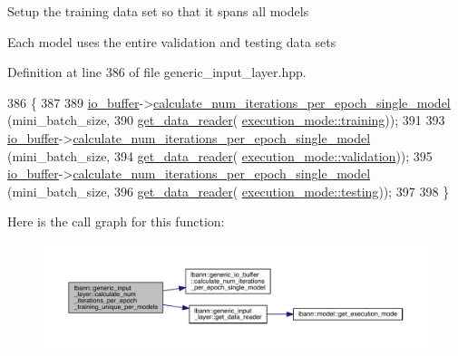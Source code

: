 Setup the training data set so that it spans all models

Each model uses the entire validation and testing data sets 

Definition at line 386 of file generic\+\_\+input\+\_\+layer.\+hpp.


\begin{DoxyCode}
386                                                                                           \{
387 
389     \hyperlink{classlbann_1_1generic__input__layer_a9dfe8b9afaebc7a5bcb0177ee2ab428f}{io\_buffer}->\hyperlink{classlbann_1_1generic__io__buffer_a4c71135fada7f0da0b315d538d327e59}{calculate\_num\_iterations\_per\_epoch\_single\_model}
      (mini\_batch\_size,
390                                                                \hyperlink{classlbann_1_1generic__input__layer_aba732becdb02627e3ad4493ac19e8fb6}{get\_data\_reader}(
      \hyperlink{base_8hpp_a2781a159088df64ed7d47cc91c4dc0a8ac185ddac8b5a8f5aa23c5b80bc12d214}{execution\_mode::training}));
391 
393     \hyperlink{classlbann_1_1generic__input__layer_a9dfe8b9afaebc7a5bcb0177ee2ab428f}{io\_buffer}->\hyperlink{classlbann_1_1generic__io__buffer_a4c71135fada7f0da0b315d538d327e59}{calculate\_num\_iterations\_per\_epoch\_single\_model}
      (mini\_batch\_size,
394                                                                \hyperlink{classlbann_1_1generic__input__layer_aba732becdb02627e3ad4493ac19e8fb6}{get\_data\_reader}(
      \hyperlink{base_8hpp_a2781a159088df64ed7d47cc91c4dc0a8aa617908b172c473cb8e8cda059e55bf0}{execution\_mode::validation}));
395     \hyperlink{classlbann_1_1generic__input__layer_a9dfe8b9afaebc7a5bcb0177ee2ab428f}{io\_buffer}->\hyperlink{classlbann_1_1generic__io__buffer_a4c71135fada7f0da0b315d538d327e59}{calculate\_num\_iterations\_per\_epoch\_single\_model}
      (mini\_batch\_size,
396                                                                \hyperlink{classlbann_1_1generic__input__layer_aba732becdb02627e3ad4493ac19e8fb6}{get\_data\_reader}(
      \hyperlink{base_8hpp_a2781a159088df64ed7d47cc91c4dc0a8aae2b1fca515949e5d54fb22b8ed95575}{execution\_mode::testing}));
397 
398   \}
\end{DoxyCode}
Here is the call graph for this function\+:\nopagebreak
\begin{figure}[H]
\begin{center}
\leavevmode
\includegraphics[width=350pt]{classlbann_1_1generic__input__layer_a0f09422a09e76da77ac42b3037173041_cgraph}
\end{center}
\end{figure}

